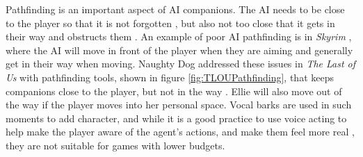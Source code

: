 \documentclass{IEEEtran}
\begin{document}
Pathfinding is an important aspect of AI companions. The AI needs to be close to the player so that it is not forgotten \cite{GAIP2EllieAI}, but also not too close that it gets in their way and obstructs them \cite{CoupledEmpowermentMaximisation}. An example of poor AI pathfinding is in \textit{Skyrim} \cite{tremblay2013adaptive}, where the AI will move in front of the player when they are aiming and generally get in their way when moving. Naughty Dog addressed these issues in \textit{The Last of Us} with pathfinding tools, shown in figure \ref{fig:TLOUPathfinding}, that keeps companions close to the player, but not in the way \cite{GAIP2EllieAI}. Ellie will also move out of the way if the player moves into her personal space. Vocal barks are used in such moments to add character, and while it is a good practice to use voice acting to help make the player aware of the agent’s actions, and make them feel more real \cite{GMTGoodAI}, they are not suitable for games with lower budgets.
\end{document}
